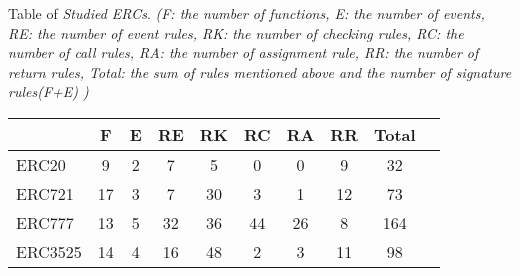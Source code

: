 \begin{table}
\centering
\small
{Table of \textit{Studied ERCs}.}
{\textit{(F: the number of functions, E: the number of events, RE: the number of event rules, RK: the number of checking rules, RC: the number of call rules, RA: the number of assignment rule, RR: the number of return rules, Total: the sum of rules mentioned above and the number of signature rules(F+E) )}}
{
  \begin{tabular}{|l|c|c|c|c|c|c|c|c|c|}
    \hline
        & \textbf{F} & \textbf{E} &  \textbf{RE} & \textbf{RK} & \textbf{RC} & \textbf{RA} & \textbf{RR} & \textbf{Total} \\
     \hline
      ERC20  & 9 & 2  & 7 & 5 & 0  & 0 & 9 & 32    \\ \hline 
      ERC721 & 17 & 3  & 7 & 30 & 3  & 1 & 12 & 73     \\                                                        \hline
      ERC777 & 13 & 5  & 32 & 36 & 44  & 26 & 8 & 164     \\                                                        \hline
      ERC3525 &  14 & 4 & 16 & 48 & 2  & 3 & 11 & 98   \\ \hline 

  \hline
  \end{tabular}
}
\end{table}